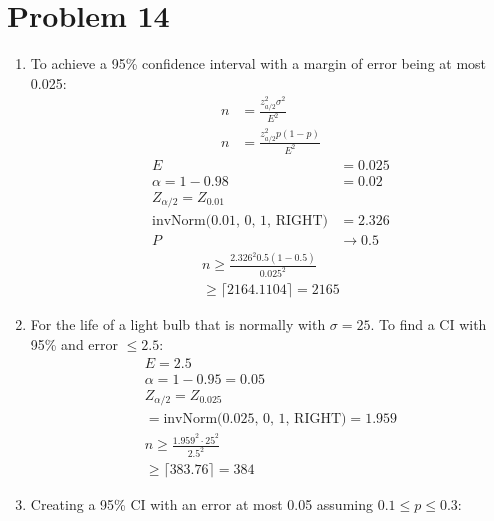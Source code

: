 \documentclass{article}
\newcommand{\ceil}[1]{\lceil {#1} \rceil}
\begin{document}
\section*{Problem 14}
\begin{enumerate}[label=(\alph*)]
    \item To achieve a 95\% confidence interval with a margin of error being at most 0.025:
          \begin{align*}
              n & = \frac{z_{a/2}^2 \sigma^2}{E^2} \\
              n & = \frac{z_{a/2}^2 p(1-p)}{E^2}
          \end{align*}
          \begin{align*}
              E                                                               & = 0.025         \\
              \alpha = 1 - 0.98                                               & = 0.02          \\
              Z_{\alpha/2}                                         = Z_{0.01} &                 \\
              \text{invNorm(0.01, 0, 1, RIGHT)}                               & =  2.326        \\
              P                                                               & \rightarrow 0.5
          \end{align*}
          \begin{align*}
              n \geq \frac{2.326^2 0.5(1 - 0.5)}{0.025^2} \\
              \geq \ceil{2164.1104} = 2165
          \end{align*}
    \item For the life of a light bulb that is normally with \(\sigma = 25\). To find a CI with 95\% and error \(\leq 2.5\):
          \begin{align*}
              E = 2.5                                      \\
              \alpha = 1 - 0.95 = 0.05                     \\
              Z_{\alpha/2} = Z_{0.025}                     \\
              = \text{invNorm(0.025, 0, 1, RIGHT)} = 1.959 \\
              n \geq \frac{1.959^2 \cdot 25^2}{2.5^2}      \\
              \geq \ceil{383.76} = 384\end{align*}
    \item Creating a 95\% CI with an error at most 0.05 assuming \(0.1 \leq p \leq 0.3\):

\end{enumerate}
\end{document}
